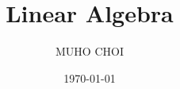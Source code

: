 \title{Linear Algebra}
\author{MUHO CHOI}
\date{\today}
\newcommand{\bookversion}{0.1.0}
\newcommand{\bookslug}{linear-algebra}
\newcommand{\bookcoursecode}{MTH204}
\newcommand{\bookdisplaytitle}{Linear Algebra}
